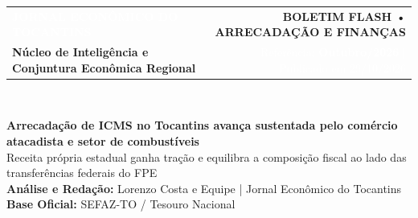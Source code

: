 \documentclass[10pt,a4paper]{article}
\begin{document}
\color{cinzatexto}

\noindent\colorbox{azulto}{%
  \parbox{\dimexpr\textwidth-2\fboxsep\relax}{%
    \vspace{6pt}%
    \begin{tabularx}{\linewidth}{@{}X r@{}}
      {\fontsize{15}{18}\selectfont\textbf{\textcolor{white}{JORNAL ECONÔMICO DO TOCANTINS}}} &
      \colorbox{douradoto}{\textbf{\footnotesize\textcolor{azulto}{\hspace{4pt}BOLETIM FLASH • ARRECADAÇÃO E FINANÇAS\hspace{4pt}}}} \\[4pt]
      {\footnotesize\textcolor{douradoto}{\textbf{Núcleo de Inteligência e Conjuntura Econômica Regional}}} &
      {\footnotesize\textcolor{white}{Referência: \textbf{Outubro/2026} $\vert$ Publicado em 29/10/2026}}
    \end{tabularx}%
    \vspace{4pt}%
  }%
}\\[-2pt]
\noindent{\color{douradoto}\rule{\textwidth}{2.5pt}}

\vspace{6pt}

{\fontsize{16}{20}\selectfont\textbf{\textcolor{azulto}{Arrecadação de ICMS no Tocantins avança sustentada pelo comércio atacadista e setor de combustíveis}}}\\[4pt]
{\normalsize\textcolor{cinzasuave}{Receita própria estadual ganha tração e equilibra a composição fiscal ao lado das transferências federais do FPE}}\\[4pt]
{\footnotesize\textcolor{azulto}{\textbf{Análise e Redação:}} \textcolor{cinzatexto}{Lorenzo Costa e Equipe | Jornal Econômico do Tocantins} \hfill \textcolor{azulto}{\textbf{Base Oficial:}} \textcolor{cinzatexto}{SEFAZ-TO / Tesouro Nacional}}

\vspace{2pt}

\noindent{}
\end{document}

